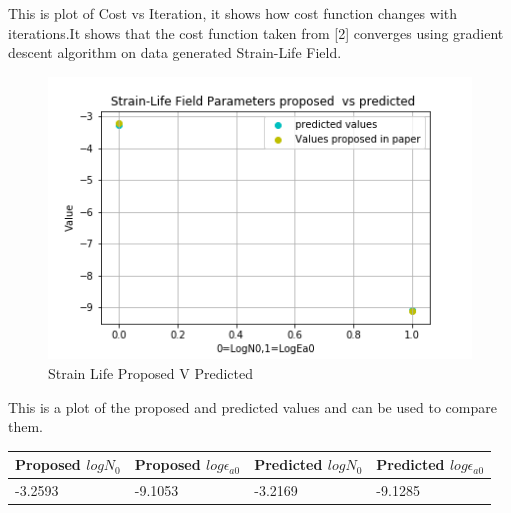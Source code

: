 \documentclass[11pt]{article}
\begin{document}
This is plot of Cost vs Iteration, it shows how cost function changes
with iterations.It shows that the cost function taken from {[}2{]}
converges using gradient descent algorithm on data generated Strain-Life
Field.

\begin{figure}
\centering
\includegraphics{images/StrainLifePropvPred.png}
\caption{Strain Life Proposed V Predicted}
\end{figure}

This is a plot of the proposed and predicted values and can be used to
compare them.

\begin{longtable}[]{@{}llll@{}}
\toprule
\begin{minipage}[b]{0.22\columnwidth}\raggedright
Proposed \(logN_0\)\strut
\end{minipage} & \begin{minipage}[b]{0.22\columnwidth}\raggedright
Proposed \(log\epsilon_{a0}\)\strut
\end{minipage} & \begin{minipage}[b]{0.22\columnwidth}\raggedright
Predicted \(logN_0\)\strut
\end{minipage} & \begin{minipage}[b]{0.22\columnwidth}\raggedright
Predicted \(log\epsilon_{a0}\)\strut
\end{minipage}\tabularnewline
\midrule
\endhead
\begin{minipage}[t]{0.22\columnwidth}\raggedright
-3.2593\strut
\end{minipage} & \begin{minipage}[t]{0.22\columnwidth}\raggedright
-9.1053\strut
\end{minipage} & \begin{minipage}[t]{0.22\columnwidth}\raggedright
-3.2169\strut
\end{minipage} & \begin{minipage}[t]{0.22\columnwidth}\raggedright
-9.1285\strut
\end{minipage}\tabularnewline
\bottomrule
\end{longtable}
\end{document}
